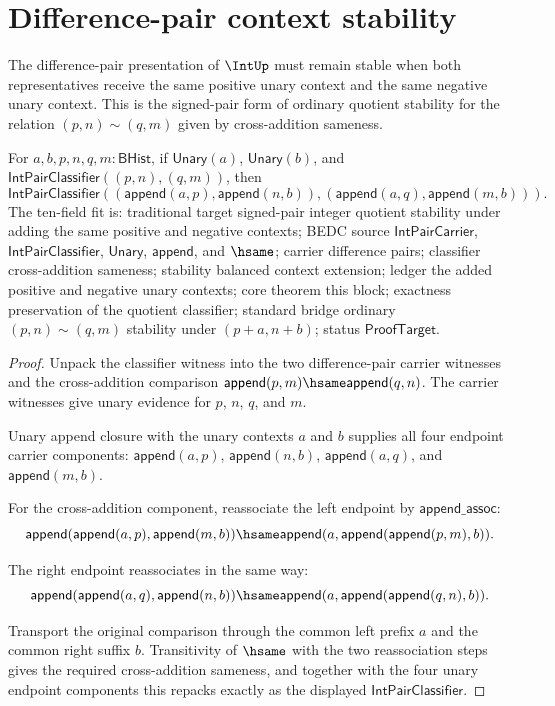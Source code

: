 \section{Difference-pair context stability}
\label{sec:int-difference-pair-balanced-context-stability}

The difference-pair presentation of $\IntUp$ must remain stable when both
representatives receive the same positive unary context and the same negative
unary context. This is the signed-pair form of ordinary quotient stability for
the relation $(p,n)\sim(q,m)$ given by cross-addition sameness.

\begin{theorem}
\label{thm:int-pair-classifier-balanced-append-context}
For $a,b,p,n,q,m:\mathsf{BHist}$, if $\mathsf{Unary}(a)$,
$\mathsf{Unary}(b)$, and
$\mathsf{IntPairClassifier}((p,n),(q,m))$, then
$$
\mathsf{IntPairClassifier}
((\mathsf{append}(a,p),\mathsf{append}(n,b)),
(\mathsf{append}(a,q),\mathsf{append}(m,b))).
$$
The ten-field fit is: traditional target signed-pair integer quotient
stability under adding the same positive and negative contexts; BEDC source
$\mathsf{IntPairCarrier}$, $\mathsf{IntPairClassifier}$, $\mathsf{Unary}$,
$\mathsf{append}$, and $\hsame$; carrier difference pairs; classifier
cross-addition sameness; stability balanced context extension; ledger the added
positive and negative unary contexts; core theorem this block; exactness
preservation of the quotient classifier; standard bridge ordinary $(p,n)\sim
(q,m)$ stability under $(p+a,n+b)$; status $\mathsf{ProofTarget}$.
\end{theorem}
\begin{proof}
Unpack the classifier witness into the two difference-pair carrier witnesses
and the cross-addition comparison
$\mathsf{append}(p,m)\hsame\mathsf{append}(q,n)$. The carrier witnesses give
unary evidence for $p$, $n$, $q$, and $m$.

Unary append closure with the unary contexts $a$ and $b$ supplies all four
endpoint carrier components:
$\mathsf{append}(a,p)$, $\mathsf{append}(n,b)$,
$\mathsf{append}(a,q)$, and $\mathsf{append}(m,b)$.

For the cross-addition component, reassociate the left endpoint by
$\mathsf{append\_assoc}$:
$$
\mathsf{append}(\mathsf{append}(a,p),\mathsf{append}(m,b))
\hsame
\mathsf{append}(a,\mathsf{append}(\mathsf{append}(p,m),b)).
$$

The right endpoint reassociates in the same way:
$$
\mathsf{append}(\mathsf{append}(a,q),\mathsf{append}(n,b))
\hsame
\mathsf{append}(a,\mathsf{append}(\mathsf{append}(q,n),b)).
$$

Transport the original comparison through the common left prefix $a$ and the
common right suffix $b$. Transitivity of $\hsame$ with the two reassociation
steps gives the required cross-addition sameness, and together with the four
unary endpoint components this repacks exactly as the displayed
$\mathsf{IntPairClassifier}$.
\end{proof}

